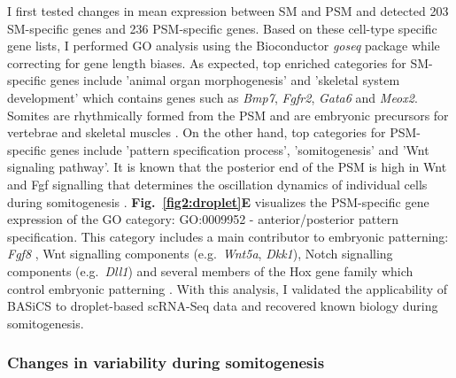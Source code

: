 I first tested changes in mean expression between SM and PSM and detected 203 SM-specific genes and 236 PSM-specific genes. Based on these cell-type specific gene lists, I performed GO analysis using the Bioconductor \emph{goseq} package while correcting for gene length biases. As expected, top enriched categories for SM-specific genes include 'animal organ morphogenesis' and 'skeletal system development' which contains genes such as \textit{Bmp7}, \textit{Fgfr2}, \textit{Gata6} and \textit{Meox2}. Somites are rhythmically formed from the PSM and are embryonic precursors for vertebrae and skeletal muscles \citep{Dequeant2008}. On the other hand, top categories for PSM-specific genes include 'pattern specification process', 'somitogenesis' and 'Wnt signaling pathway'. It is known that the posterior end of the PSM is high in Wnt and Fgf signalling that determines the oscillation dynamics of individual cells during somitogenesis \citep{Oates2012}. \textbf{Fig.~\ref{fig2:droplet}E} visualizes the PSM-specific gene expression of the GO category: GO:0009952 - anterior/posterior pattern specification. This category includes a main contributor to embryonic patterning: \textit{Fgf8} \citep{Dubrulle2004}, Wnt signalling components (e.g.~\textit{Wnt5a}, \textit{Dkk1}), Notch signalling components (e.g.~\textit{Dll1}) \citep{Dequeant2008} and several members of the Hox gene family which control embryonic patterning \citep{Pearson2005}. With this analysis, I validated the applicability of BASiCS to droplet-based scRNA-Seq data and recovered known biology during somitogenesis. 

\newpage

\subsubsection{Changes in variability during somitogenesis}

